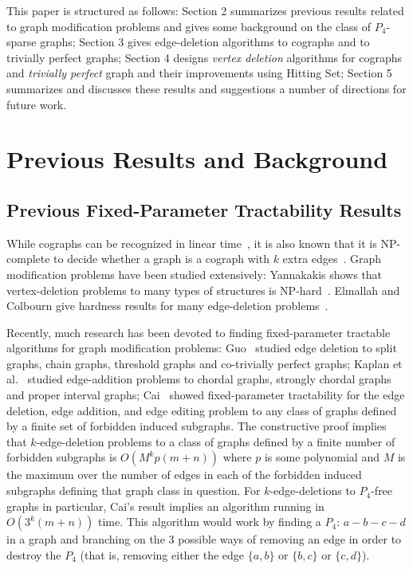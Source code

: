 \documentclass{llncs}
\begin{document}
This paper is structured as follows: Section 2 summarizes previous results related to graph modification problems and gives some background on the class of $P_4$-sparse graphs; Section 3 gives edge-deletion algorithms to cographs and to trivially perfect graphs; Section 4 designs \emph{vertex deletion} algorithms for cographs and \emph{trivially perfect} graph and their improvements using {\sc Hitting Set}; Section 5 summarizes and discusses these results and suggestions a number of directions for future work.

\section{Previous Results and Background}

\subsection{Previous Fixed-Parameter Tractability Results}

While cographs can be recognized in linear time~\cite{CPS}, it is also known that it is NP-complete to decide whether a graph is a cograph with $k$ extra edges~\cite{ElMC}. Graph modification problems have been studied extensively: Yannakakis shows that vertex-deletion problems to many types of structures is NP-hard~\cite{Yanna}. Elmallah and Colbourn give hardness results for many edge-deletion problems~\cite{ElMC}.

Recently, much research has been devoted to finding fixed-parameter tractable algorithms for graph modification problems: Guo~\cite{Guo} studied edge deletion to split graphs, chain graphs, threshold graphs and co-trivially perfect graphs; Kaplan et al.~\cite{KST} studied edge-addition problems to chordal graphs, strongly chordal graphs and proper interval graphs; Cai~\cite{CAI} showed fixed-parameter tractability for the edge deletion, edge addition, and edge editing problem to any class of graphs defined by a finite set of forbidden induced subgraphs. The constructive proof implies that $k$-edge-deletion problems to a class of graphs defined by a finite number of forbidden subgraphs is $O(M^kp(m+n))$ where $p$ is some polynomial and $M$ is the maximum over the number of edges in each of the forbidden induced subgraphs defining that graph class in question. For $k$-edge-deletions to $P_4$-free graphs in particular, Cai's result implies an algorithm running in $O(3^k(m+n))$ time. This algorithm would work by finding a $P_4$: $a-b-c-d$ in a graph and branching on the 3 possible ways of removing an edge in order to destroy the $P_4$ (that is, removing either the edge $\{a,b\}$ or $\{b,c\}$ or $\{c,d\}$).
\end{document}
